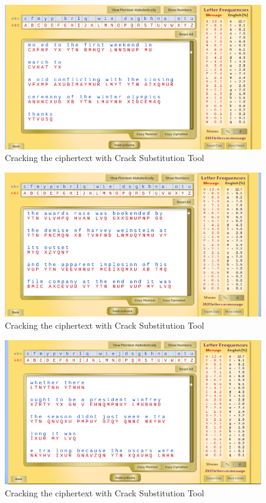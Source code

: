 \documentclass[12pt]{article}
\begin{document}
\begin{figure}[!ht]
    \begin{center}
        \includegraphics[scale=0.48]{c15.png}
    \end{center}{}
    \caption{Cracking the ciphertext with Crack Substitution Tool}
    \label{fig:c15}
\end{figure}

\begin{figure}[!ht]
    \begin{center}
        \includegraphics[scale=0.48]{c16.png}
    \end{center}{}
    \caption{Cracking the ciphertext with Crack Substitution Tool}
    \label{fig:c16}
\end{figure}

\begin{figure}[!ht]
    \begin{center}
        \includegraphics[scale=0.48]{c17.png}
    \end{center}{}
    \caption{Cracking the ciphertext with Crack Substitution Tool}
    \label{fig:c17}
\end{figure}
\end{document}
